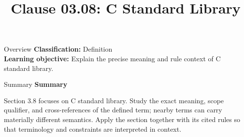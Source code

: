 \documentclass[10pt,letterpaper]{article}
\title{Clause 03.08: C Standard Library}
\author{}
\date{}
\begin{document}
\maketitle
\begin{CornellOverviewBox}{Overview}
\textbf{Classification:} Definition\\[2pt]
\textbf{Learning objective:} Explain the precise meaning and rule context of C standard library.
\end{CornellOverviewBox}\begin{CornellSummaryBox}{Summary}
{\sffamily\bfseries\color{Accent} Summary}\par\vspace{3pt}Section 3.8 focuses on C standard library. Study the exact meaning, scope qualifier, and cross-references of the defined term; nearby terms can carry materially different semantics. Apply the section together with its cited rules so that terminology and constraints are interpreted in context.
\end{CornellSummaryBox}
\end{document}
